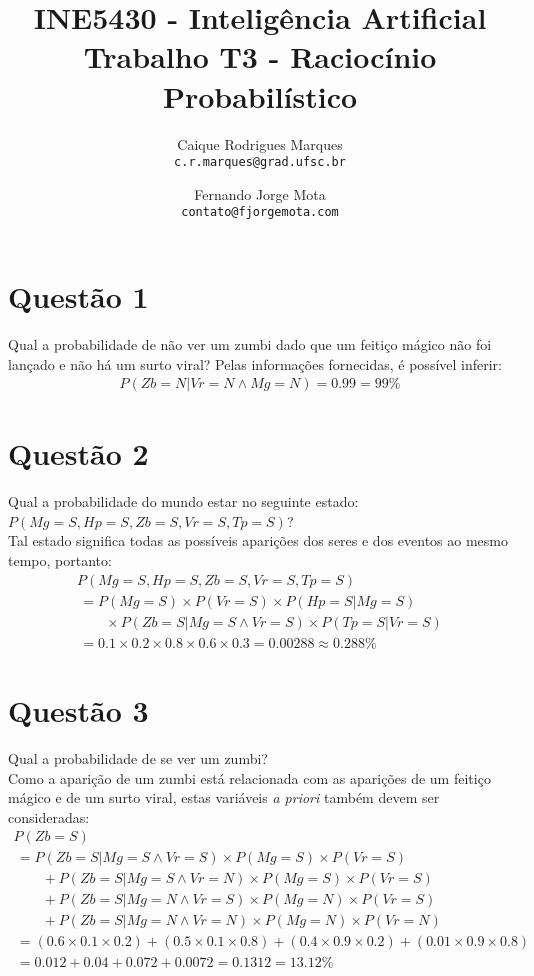 \documentclass{article}
\title{\textbf{INE5430 - Inteligência Artificial \\
        \large Trabalho T3 - Raciocínio Probabilístico}}
\author{
    Caique Rodrigues Marques \\
    {\texttt{c.r.marques@grad.ufsc.br}}
    \and
    Fernando Jorge Mota \\
    {\texttt{contato@fjorgemota.com}}
    \vspace{-5mm}
}
\date{}
\begin{document}
    \maketitle
    \section*{Questão 1}
        Qual a probabilidade de não ver um zumbi dado que um feitiço
        mágico não foi lançado e não há um surto viral? Pelas informações
        fornecidas, é possível inferir:
        \begin{gather*}
            P(Zb=N|Vr=N \land Mg=N) = 0.99 = 99\%
        \end{gather*}

    \section*{Questão 2}
        Qual a probabilidade do mundo estar no seguinte estado: 
        $P(Mg=S, Hp=S, Zb=S, Vr=S, Tp=S)$? \\
        Tal estado significa todas as possíveis aparições dos seres e dos
        eventos ao mesmo tempo, portanto:
        \begin{gather*}
            P(Mg=S, Hp=S, Zb=S, Vr=S, Tp=S) \\
            \,= P(Mg=S) \times P(Vr=S) \times P(Hp=S|Mg=S) \\
            \qquad\times P(Zb=S|Mg=S \land Vr=S) \times P(Tp=S|Vr=S) \\
            \,= 0.1 \times 0.2 \times 0.8 \times 0.6 \times 0.3
            = 0.00288 \approx 0.288\%
        \end{gather*}

    \section*{Questão 3}
        Qual a probabilidade de se ver um zumbi? \\
        Como a aparição de um zumbi está relacionada com as aparições de um
        feitiço mágico e de um surto viral, estas variáveis \textit{a priori}
        também devem ser consideradas:
        \begin{gather*}
            P(Zb=S) \\
            \,= P(Zb=S|Mg=S \land Vr=S) \times P(Mg=S) \times P(Vr=S) \\
            \qquad+ P(Zb=S|Mg=S \land Vr=N) \times P(Mg=S) \times P(Vr=S) \\
            \qquad+ P(Zb=S|Mg=N \land Vr=S) \times P(Mg=N) \times P(Vr=S) \\
            \qquad+ P(Zb=S|Mg=N \land Vr=N) \times P(Mg=N) \times P(Vr=N) \\
            \,= (0.6 \times 0.1 \times 0.2) + (0.5 \times 0.1 \times 0.8)
            + (0.4 \times 0.9 \times 0.2) + (0.01 \times 0.9 \times 0.8) \\
            \,= 0.012 + 0.04 + 0.072 + 0.0072
            = 0.1312 = 13.12\%
        \end{gather*}
\end{document}
